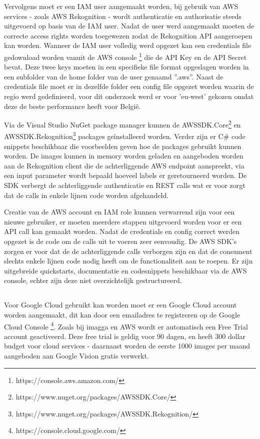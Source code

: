 Vervolgens moet er een IAM user aangemaakt worden, bij gebruik van AWS services - zoals AWS Rekognition - wordt authenticatie en authorisatie steeds uitgevoerd op basis van de IAM user. Nadat de user werd aangemaakt moeten de correcte access rights worden toegewezen zodat de Rekognition API aangeroepen kan worden. Wanneer de IAM user volledig werd opgezet kan een credentials file gedownload worden vanuit de AWS console \footnote{https://console.aws.amazon.com/} die de API Key en de API Secret bevat. Deze twee keys moeten in een specifieke file format opgeslagen worden in een subfolder van de home folder van de user genaamd ''.aws''. Naast de credentials file moet er in dezelfde folder een config file opgezet worden waarin de regio werd gedefinieerd, voor dit onderzoek werd er voor 'eu-west' gekozen omdat deze de beste performance heeft voor België.

Via de Visual Studio NuGet package manager kunnen de AWSSDK.Core\footnote{https://www.nuget.org/packages/AWSSDK.Core/} en AWSSDK.Rekognition\footnote{https://www.nuget.org/packages/AWSSDK.Rekognition/} packages geïnstalleerd worden. Verder zijn er C\# code snippets beschikbaar die voorbeelden geven hoe de packages gebruikt kunnen worden. De images kunnen in memory worden geladen en aangeboden worden aan de Rekognition client die de achterliggende AWS endpoint aanspreekt, via een input parameter wordt bepaald hoeveel labels er geretourneerd worden. De SDK verbergt de achterliggende authenticatie en REST calls wat er voor zorgt dat de calls in enkele lijnen code worden afgehandeld.

Creatie van de AWS account en IAM role kunnen verwarrend zijn voor een nieuwe gebruiker, er moeten meerdere stappen uitgevoerd worden voor er een API call kan gemaakt worden. Nadat de credentials en config correct werden opgezet is de code om de calls uit te voeren zeer eenvoudig. De AWS SDK's zorgen er voor dat de de achterliggende calls verborgen zijn en dat de consument slechts enkele lijnen code nodig heeft om de functionaliteit aan te roepen. Er zijn uitgebreide quickstarts, documentatie en codesnippets beschikbaar via de AWS console, echter zijn deze niet overzichtelijk gestructureerd.

\subsection{}
\label{sec:integration-google}
Voor Google Cloud gebruikt kan worden moet er een Google Cloud account worden aangemaakt, dit kan door een emailadres te registreren op de Google Cloud Console \footnote{https://console.cloud.google.com/}. Zoals bij imagga en AWS wordt er automatisch een Free Trial account geactiveerd. Deze free trial is geldig voor 90 dagen, en heeft 300 dollar budget voor cloud services - daarnaast worden de eerste 1000 images per maand aangeboden aan Google Vision gratis verwerkt.

